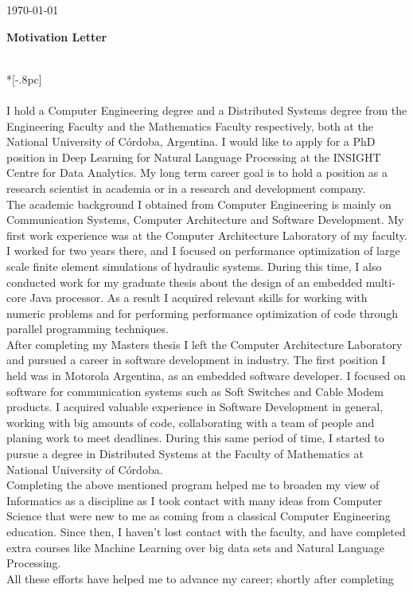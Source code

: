 \documentclass[letter,12pt,english]{article}
\begin{document}
{ \hfill \today  


\large
\bf Motivation Letter} \\*[-.8pc]
\\
\\
I hold a Computer Engineering degree and a Distributed Systems degree from the Engineering Faculty
and the Mathematics Faculty respectively, both at the National University of C\'ordoba, Argentina.
I would like to apply for a PhD position in Deep Learning for Natural Language Processing at the
INSIGHT Centre for Data Analytics. My long term career goal is to
hold a position as a research scientist in academia or in a research and development company.
\\
The academic background I obtained from Computer Engineering is mainly on Communication Systems,
Computer Architecture and Software Development. My first work experience was at the Computer 
Architecture Laboratory of my faculty. I worked for two years there, and I focused on performance
optimization of large scale finite element simulations of hydraulic systems. During this time, I 
also conducted work for my graduate thesis about the design of an embedded multi-core Java processor.
As a result I acquired relevant skills for working with numeric problems and for
performing performance optimization of code through parallel programming techniques.
\\
After completing my Masters thesis I left the Computer Architecture Laboratory and pursued a career
in software development in industry. The first position I held was in Motorola Argentina, as an embedded
software developer. I focused on software for communication systems such as Soft Switches and Cable Modem
products. I acquired valuable experience in Software Development in general, working with big amounts of
code, collaborating with a team of people and planing work to meet deadlines. During this same period of 
time, I started to pursue a degree in Distributed Systems at the Faculty of Mathematics at National 
University of C\'ordoba.
\\
Completing the above mentioned program helped me to broaden my view of Informatics as a discipline
as I took contact with many ideas from Computer Science that were new to me as coming from a classical 
Computer Engineering education.
Since then, I haven't lost contact with the faculty, and have completed extra courses like Machine Learning
over big data sets and Natural Language Processing. 
\\
All these efforts have helped me to advance my career; shortly after completing 
\end{document}
